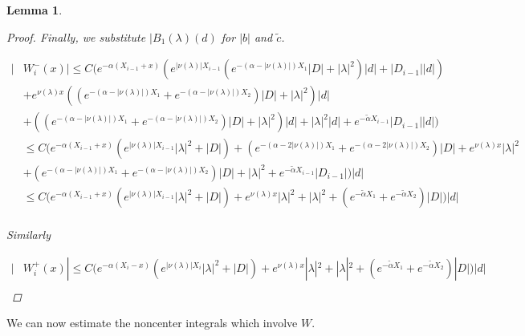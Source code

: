 \documentclass[12pt]{article}
\newtheorem{lemma}{Lemma}
\begin{document}
\begin{lemma}
\begin{proof}
Finally, we substitute $|B_1(\lambda)(d)$ for $|b|$ and $\tilde{c}$.

\begin{align*}
| &W_i^-(x)| \leq C \Big(e^{-\alpha(X_{i-1} + x)}( e^{|\nu(\lambda)| X_{i-1}} ( e^{-(\alpha - |\nu(\lambda)|) X_1} |D| + |\lambda|^2 )|d| + |D_{i-1}||d| ) \\
&+ e^{\nu(\lambda)x} ( (e^{-(\alpha - |\nu(\lambda)|) X_1} + e^{-(\alpha - |\nu(\lambda)|) X_2})|D| + |\lambda|^2 )|d| \\ &+ ( (e^{-(\alpha - |\nu(\lambda)|) X_1} + e^{-(\alpha - |\nu(\lambda)|) X_2}) |D| + |\lambda|^2 )|d| + |\lambda|^2 |d| + e^{-\tilde{\alpha} X_{i-1}} |D_{i-1}||d| \Big) \\
&\leq C \Big(e^{-\alpha(X_{i-1} + x)}( e^{|\nu(\lambda)| X_{i-1}} |\lambda|^2 + |D|)
+ (e^{-(\alpha - 2 |\nu(\lambda)|) X_1} +e^{-(\alpha - 2 |\nu(\lambda)|) X_2})|D| 
+ e^{\nu(\lambda)x} |\lambda|^2 \\ 
&+ (e^{-(\alpha - |\nu(\lambda)|) X_1} + e^{-(\alpha - |\nu(\lambda)|) X_2} )|D| 
+ |\lambda|^2 + e^{-\tilde{\alpha} X_{i-1}} |D_{i-1}| \Big) |d| \\
&\leq C \Big(e^{-\alpha(X_{i-1} + x)}( e^{|\nu(\lambda)| X_{i-1}} |\lambda|^2 + |D|) + e^{\nu(\lambda)x} |\lambda|^2 
+ |\lambda|^2 + (e^{-\tilde{\alpha} X_1} + e^{-\tilde{\alpha} X_2}) |D| \Big) |d| \\
\end{align*}

Similarly

\begin{align*}
| &W_i^+(x)| \leq C \Big(e^{-\alpha(X_i - x)}( e^{|\nu(\lambda)| X_i} |\lambda|^2 + |D|) + e^{\nu(\lambda)x} |\lambda|^2 
+ |\lambda|^2 + (e^{-\tilde{\alpha} X_1} + e^{-\tilde{\alpha} X_2}) |D| \Big) |d| \\
\end{align*}
\end{proof}
\end{lemma}

We can now estimate the noncenter integrals which involve $W$.
\end{document}
